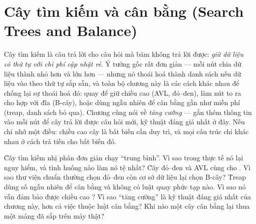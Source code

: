 \documentclass[../../algorithm.tex]{subfiles}
\begin{document}
\chapter{Cây tìm kiếm và cân bằng (Search Trees and Balance)}

\begin{tomtat}
Cây tìm kiếm là câu trả lời cho câu hỏi mà băm không trả lời được: \emph{giữ dữ liệu có thứ tự với chi phí cập nhật rẻ}. Ý tưởng gốc rất đơn giản --- mỗi nút chia dữ liệu thành nhỏ hơn và lớn hơn --- nhưng nó thoái hoá thành danh sách nếu dữ liệu vào theo thứ tự sắp sẵn, và toàn bộ chương này là các cách khác nhau để chống lại sự thoái hoá đó: quay để giữ chiều cao (AVL, đỏ--đen), làm nút to ra cho hợp với đĩa (B-cây), hoặc dùng ngẫu nhiên để cân bằng gần như miễn phí (treap, danh sách bỏ qua). Chương cũng nói về \emph{tăng cường} --- gắn thêm thông tin vào mỗi nút để cây trả lời được câu hỏi mới, kỹ thuật đáng giá nhất ở đây. Nếu chỉ nhớ một điều: chiều cao cây là bất biến cần duy trì, và mọi cấu trúc chỉ khác nhau ở cách trả tiền cho bất biến đó.
\end{tomtat}

\begin{nentang}
\end{nentang}

\begin{khoigoi}
\h{Cây tìm kiếm nhị phân đơn giản chạy  ``trung bình''. Vì sao trong thực tế nó lại nguy hiểm, và tình huống nào làm nó tệ nhất?}
\h{Cây đỏ--đen và AVL cùng cho . Vì sao thư viện chuẩn thường chọn đỏ--đen còn cơ sở dữ liệu lại chọn B-cây?}
\h{Treap dùng số ngẫu nhiên để cân bằng và không có luật quay phức tạp nào. Vì sao nó vẫn đảm bảo được chiều cao ?}
\h{Vì sao ``tăng cường'' là kỹ thuật đáng giá nhất của chương này, hơn cả việc thuộc luật cân bằng?}
\h{Khi nào một cây cân bằng  lại thua một mảng đã sắp  trên máy thật?}
\end{khoigoi}
\end{document}
